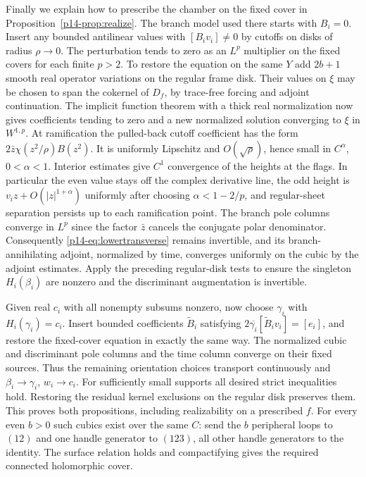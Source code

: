 Finally we explain how to prescribe the chamber on the fixed cover in
Proposition~\ref{p14-prop:realize}. The branch model used there starts
with $B_i=0$. Insert any bounded antilinear values with
$[B_iv_i]\ne0$ by cutoffs on disks of radius $\rho\to0$. The
perturbation tends to zero as an $L^p$ multiplier on the fixed
covers for each finite $p>2$. To restore the equation on the same
$Y$ add $2b+1$ smooth real operator variations on the regular
frame disk. Their values on $\xi$ may be chosen to span the
cokernel of $D_f$, by trace-free forcing and adjoint continuation.
The implicit function theorem with a thick real normalization now
gives coefficients tending to zero and a new normalized solution
converging to $\xi$ in $W^{1,p}$. At ramification the pulled-back
cutoff coefficient has the form $2\bar z\chi(z^2/\rho)B(z^2)$.
It is uniformly Lipschitz and $O(\sqrt\rho)$, hence small in
$C^\alpha$, $0<\alpha<1$. Interior estimates give $C^1$ convergence
of the heights at the flags. In particular the even value stays off
the complex derivative line, the odd height is $v_i z+O(|z|^{1+\alpha})$
uniformly after choosing $\alpha<1-2/p$, and regular-sheet separation
persists up to each ramification point. The branch pole columns
converge in $L^p$ since the factor $\bar z$ cancels the conjugate
polar denominator. Consequently \eqref{p14-eq:lowertransverse} remains
invertible, and its branch-annihilating adjoint, normalized by time,
converges uniformly on the cubic by the adjoint estimates. Apply the
preceding regular-disk tests to ensure the singleton $H_i(\beta_i)$
are nonzero and the discriminant augmentation is invertible.

Given real $c_i$ with all nonempty subsums nonzero, now choose
$\gamma_i$ with $H_i(\gamma_i)=c_i$. Insert bounded coefficients
$\widetilde B_i$ satisfying
$2\overline{\gamma_i}[\widetilde B_i v_i]=[e_i]$, and restore the
fixed-cover equation in exactly the same way. The normalized cubic
and discriminant pole columns and the time column converge on their
fixed sources. Thus the remaining orientation choices transport
continuously and $\beta_i\to\gamma_i$, $w_i\to c_i$. For sufficiently
small supports all desired strict inequalities hold. Restoring the
residual kernel exclusions on the regular disk preserves them.
This proves both propositions, including realizability on a
prescribed $f$. For every even $b>0$ such cubics exist over the same
$C$: send the $b$ peripheral loops to $(12)$ and one handle
generator to $(123)$, all other handle generators to the identity.
The surface relation holds and compactifying gives the required
connected holomorphic cover.
